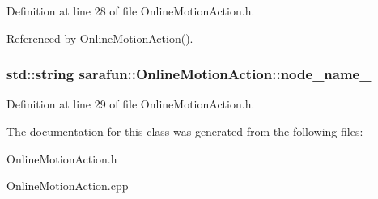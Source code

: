 Definition at line 28 of file Online\-Motion\-Action.\-h.



Referenced by Online\-Motion\-Action().

\hypertarget{classsarafun_1_1OnlineMotionAction_af29561d1cb3133a314f7dfba57463f2f_af29561d1cb3133a314f7dfba57463f2f}{
\subsubsection[{node\-\_\-name\-\_\-}]{\setlength{\rightskip}{0pt plus 5cm}std\-::string sarafun\-::\-Online\-Motion\-Action\-::node\-\_\-name\-\_\-\hspace{0.3cm}{\ttfamily [private]}}}\label{classsarafun_1_1OnlineMotionAction_af29561d1cb3133a314f7dfba57463f2f_af29561d1cb3133a314f7dfba57463f2f}


Definition at line 29 of file Online\-Motion\-Action.\-h.



The documentation for this class was generated from the following files\-:\begin{DoxyCompactItemize}
\item 
Online\-Motion\-Action.\-h\item 
Online\-Motion\-Action.\-cpp\end{DoxyCompactItemize}
